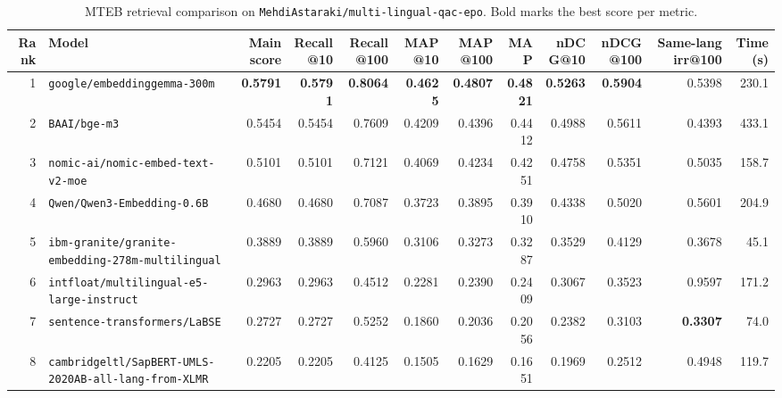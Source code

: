\begin{table}[t]
\centering
\small
\begin{tabular}{r l r r r r r r r r r r}
\hline
Rank & Model & Main score & Recall@10 & Recall@100 & MAP@10 & MAP@100 & MAP & nDCG@10 & nDCG@100 & Same-lang irr@100 & Time (s) \\
\hline
1 & \texttt{google/embeddinggemma-300m} & \textbf{0.5791} & \textbf{0.5791} & \textbf{0.8064} & \textbf{0.4625} & \textbf{0.4807} & \textbf{0.4821} & \textbf{0.5263} & \textbf{0.5904} & 0.5398 & 230.1 \\
2 & \texttt{BAAI/bge-m3} & 0.5454 & 0.5454 & 0.7609 & 0.4209 & 0.4396 & 0.4412 & 0.4988 & 0.5611 & 0.4393 & 433.1 \\
3 & \texttt{nomic-ai/nomic-embed-text-v2-moe} & 0.5101 & 0.5101 & 0.7121 & 0.4069 & 0.4234 & 0.4251 & 0.4758 & 0.5351 & 0.5035 & 158.7 \\
4 & \texttt{Qwen/Qwen3-Embedding-0.6B} & 0.4680 & 0.4680 & 0.7087 & 0.3723 & 0.3895 & 0.3910 & 0.4338 & 0.5020 & 0.5601 & 204.9 \\
5 & \texttt{ibm-granite/granite-embedding-278m-multilingual} & 0.3889 & 0.3889 & 0.5960 & 0.3106 & 0.3273 & 0.3287 & 0.3529 & 0.4129 & 0.3678 & 45.1 \\
6 & \texttt{intfloat/multilingual-e5-large-instruct} & 0.2963 & 0.2963 & 0.4512 & 0.2281 & 0.2390 & 0.2409 & 0.3067 & 0.3523 & 0.9597 & 171.2 \\
7 & \texttt{sentence-transformers/LaBSE} & 0.2727 & 0.2727 & 0.5252 & 0.1860 & 0.2036 & 0.2056 & 0.2382 & 0.3103 & \textbf{0.3307} & 74.0 \\
8 & \texttt{cambridgeltl/SapBERT-UMLS-2020AB-all-lang-from-XLMR} & 0.2205 & 0.2205 & 0.4125 & 0.1505 & 0.1629 & 0.1651 & 0.1969 & 0.2512 & 0.4948 & 119.7 \\
\hline
\end{tabular}
\caption{MTEB retrieval comparison on \texttt{MehdiAstaraki/multi-lingual-qac-epo}. Bold marks the best score per metric.}
\label{tab:mteb-model-comparison}
\end{table}
